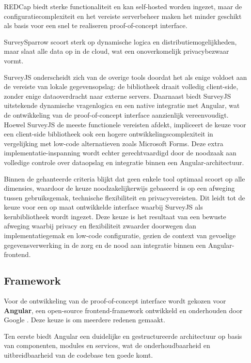 REDCap biedt sterke functionaliteit en kan self-hosted worden ingezet, 
maar de configuratiecomplexiteit en het vereiste serverbeheer maken het minder geschikt als basis voor een snel te realiseren proof-of-concept interface.
\medskip

SurveySparrow scoort sterk op dynamische logica en distributiemogelijkheden, 
maar slaat alle data op in de cloud, wat een onoverkomelijk privacybezwaar vormt.
\medskip

SurveyJS onderscheidt zich van de overige tools doordat het als enige voldoet aan de vereiste van lokale gegevensopslag: 
de bibliotheek draait volledig client-side, zonder enige dataoverdracht naar externe servers. 
Daarnaast biedt SurveyJS uitstekende dynamische vragenlogica en een native integratie met Angular, 
wat de ontwikkeling van de proof-of-concept interface aanzienlijk vereenvoudigt.
Hoewel SurveyJS de meeste functionele vereisten afdekt, impliceert de keuze voor een client-side bibliotheek ook een hogere ontwikkelingscomplexiteit in vergelijking met low-code alternatieven zoals Microsoft Forms. 
Deze extra implementatie-inspanning wordt echter gerechtvaardigd door de noodzaak aan volledige controle over dataopslag en integratie binnen een Angular-architectuur.
\medskip

Binnen de gehanteerde criteria blijkt dat geen enkele tool optimaal scoort op alle dimensies, waardoor de keuze noodzakelijkerwijs gebaseerd is op een afweging tussen gebruiksgemak, technische flexibiliteit en privacyvereisten.
Dit leidt tot de keuze voor een op maat ontwikkelde interface waarbij SurveyJS als kernbibliotheek wordt ingezet. 
Deze keuze is het resultaat van een bewuste afweging waarbij privacy en flexibiliteit zwaarder doorwegen dan implementatiegemak en low-code configuratie, gezien de context van gevoelige gegevensverwerking in de zorg en de nood aan integratie binnen een Angular-frontend.

\subsection{Framework}
\label{subsec:framework}

Voor de ontwikkeling van de proof-of-concept interface wordt gekozen voor \textbf{Angular},
een open-source frontend-framework ontwikkeld en onderhouden door Google \autocite{angularDocs}. Deze keuze is
om meerdere redenen gemaakt.
\medskip

Ten eerste biedt Angular een duidelijke en gestructureerde architectuur op basis van
componenten, modules en services, wat de onderhoudbaarheid en uitbreidbaarheid van de
codebase ten goede komt.
\medskip

